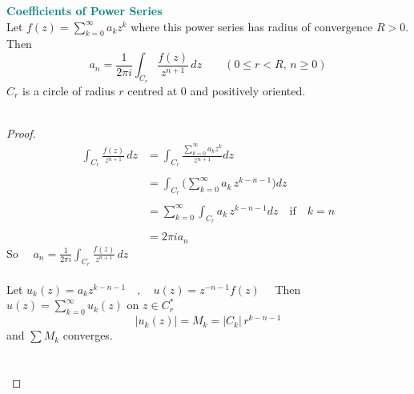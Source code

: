 \documentclass[11pt,a4paper]{article}
\theoremstyle{definition}
\begin{document}
\textbf{\textcolor{teal}{Coefficients of Power Series}}\\
Let $\displaystyle{f(z) = \sum^{\infty}_{k = 0 }a_kz^k}$ where this power series has radius of convergence $R>0$. Then
$$a_n = \frac{1}{2\pi i}\int_{C_r}\frac{f(z)}{z^{n+1}}\,dz\qquad (0\leq r< R,\,n\geq 0 )$$
$C_r$ is a circle of radius $r$ centred at $0$ and positively oriented.\\\\




\begin{proof}
\begin{align*}
\int_{C_r}\frac{f(z)}{z^{n + 1}}\,dz & = \int_{C_r}\frac{\sum\limits^{\infty}_{k = 0}a_kz^k}{z^{n + 1}}dz\\\\
& = \int_{C_r}\Bigg(\sum^{\infty}_{k= 0}a_k\,z^{k - n -1}\Bigg) dz\\\\
& = \sum^{\infty}_{k = 0}\int_{C_r}a_k\,z^{k - n -1}dz\quad \text{if}\quad  k = n\\\\
& = 2\pi i a_n
\end{align*}
So $\quad \displaystyle{a_n = \frac{1}{2\pi i}\int_{C_r}\frac{f(z)}{z^{n + 1}}\,dz}$\\\\




Let $u_k(z) = a_kz^{k - n - 1}\quad  , \quad  u(z) = z^{-n - 1}f(z)\quad $ Then $u(z) = \displaystyle{\sum^{\infty}_{k = 0}u_k(z)}$ on $z \in C_r^*$
$$\left|u_k(z)\right| = M_k  = \left|C_k\right|\, r^{k - n - 1}$$ and $\displaystyle{\sum M_k}$ converges.\\\\\\








\end{proof}
\end{document}
